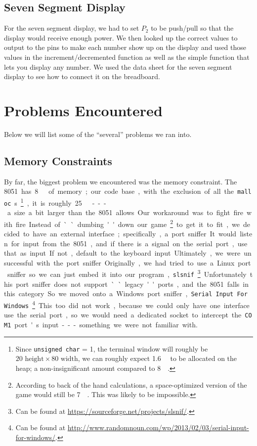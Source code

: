 \documentclass[12pt]{article}
\newcommand{\shellcmd}[1]{\texttt{\colorbox{gray!30}{#1}}}
\begin{document}
\subsection{Seven Segment Display}
For the seven segment display, we had to set $P_2$ to be push/pull so that the display would receive enough power. We then looked up the correct values to output to the pins to make each number show up on the display and used those values in the increment/decremented function as well as the simple function that lets you display any number. We used the data sheet for the seven segment display to see how to connect it on the breadboard.


\section{Problems Encountered}
Below we will list some of the ``several'' problems we ran into.

\subsection{Memory Constraints}
By far, the biggest problem we encountered was the memory constraint. The \SI{8051} has \SI{8}{\kilo\byte} of memory; our code base, with the exclusion of all the \shellcmd{malloc}s\footnote{Since \shellcmd{unsigned char} = \SI{1}{\byte}, the terminal window will roughly be $20\text{ height} \times 80\text{ width} $, we can roughly expect \SI{1.6}{\kilo\byte} to be allocated on the heap; a non-insignificant amount compared to \SI{8}{\kilo\byte}.}, it is roughly \SI{25}{\kilo\byte} --- a size a bit larger than the \num{8051} allows. Our workaround was to fight fire with fire.

Instead of ``dumbing'' down our game\footnote{According to back of the hand calculations, a space-optimized version of the game would still be \SI{7}{\kilo\byte}. This was likely to be impossible.} to get it to fit, we decided to have an external interface; specifically, a port sniffer. It would listen for input from the \num{8051}, and if there is a signal on the serial port, use that as input. If not, default to the keyboard input.

Ultimately, we were unsuccessful with the port sniffer. Originally, we had tried to use a Linux port sniffer so we can just embed it into our program, \shellcmd{slsnif}\footnote{Can be found at \url{https://sourceforge.net/projects/slsnif/}.}. Unfortunately this port sniffer does not support ``legacy'' ports, and the \num{8051} falls in this category. So we moved onto a Windows port sniffer, \shellcmd{Serial Input For Windows}\footnote{Can be found at \url{http://www.randomnoun.com/wp/2013/02/03/serial-input-for-windows/}.}. This too did not work, because we could only have one interface use the serial port, so we would need a dedicated socket to intercept the \shellcmd{COM1} port's input --- something we were not familiar with.
\end{document}
